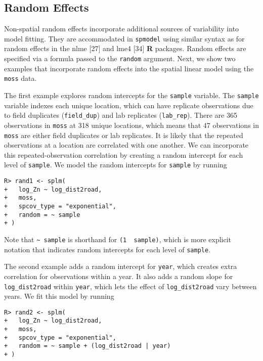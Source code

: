 \documentclass[10pt,letterpaper]{article}
\begin{document}
\hypertarget{random-effects}{%
\subsection{Random Effects}\label{random-effects}}

Non-spatial random effects incorporate additional sources of variability
into model fitting. They are accommodated in \texttt{spmodel} using
similar syntax as for random effects in the nlme {[}27{]} and lme4
{[}34{]} \textbf{\textsf{R}} packages. Random effects are specified via
a formula passed to the \texttt{random} argument. Next, we show two
examples that incorporate random effects into the spatial linear model
using the \texttt{moss} data.

The first example explores random intercepts for the \texttt{sample}
variable. The \texttt{sample} variable indexes each unique location,
which can have replicate observations due to field duplicates
(\texttt{field\_dup}) and lab replicates (\texttt{lab\_rep}). There are
365 observations in \texttt{moss} at 318 unique locations, which means
that 47 observations in \texttt{moss} are either field duplicates or lab
replicates. It is likely that the repeated observations at a location
are correlated with one another. We can incorporate this
repeated-observation correlation by creating a random intercept for each
level of \texttt{sample}. We model the random intercepts for
\texttt{sample} by running

\begin{verbatim}
R> rand1 <- splm(
+   log_Zn ~ log_dist2road,
+   moss,
+   spcov_type = "exponential",
+   random = ~ sample
+ )
\end{verbatim}

Note that \texttt{\textasciitilde{}\ sample} is shorthand for
\texttt{(1\ \textbar{}\ sample)}, which is more explicit notation that
indicates random intercepts for each level of \texttt{sample}.

The second example adds a random intercept for \texttt{year}, which
creates extra correlation for observations within a year. It also adds a
random slope for \texttt{log\_dist2road} within \texttt{year}, which
lets the effect of \texttt{log\_dist2road} vary between years. We fit
this model by running

\begin{verbatim}
R> rand2 <- splm(
+   log_Zn ~ log_dist2road,
+   moss,
+   spcov_type = "exponential",
+   random = ~ sample + (log_dist2road | year)
+ )
\end{verbatim}
\end{document}
